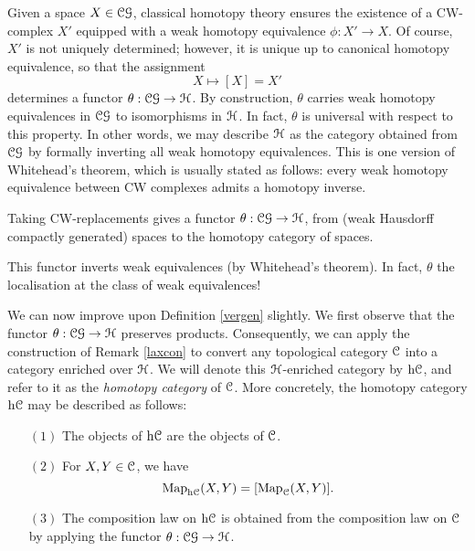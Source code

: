 Given a space $X \in \operatorname{\mathcal{C}\mathcal{G}}$, classical homotopy theory ensures the existence of a CW-complex
$X'$ equipped with a weak homotopy equivalence $\phi: X' \rightarrow X$. Of course,
$X'$ is not uniquely determined; however, it is unique up to canonical homotopy equivalence,
so that the assignment
$$ X \mapsto [X] = X'$$
determines a functor $\theta: \operatorname{\mathcal{C}\mathcal{G}} \rightarrow \operatorname{\mathcal{H}}$. By construction, $\theta$ carries
weak homotopy equivalences in $\operatorname{\mathcal{C}\mathcal{G}}$ to isomorphisms in $\operatorname{\mathcal{H}}$. In fact, $\theta$
is universal with respect to this property. In other words, we may describe $\operatorname{\mathcal{H}}$
as the category obtained from $\operatorname{\mathcal{C}\mathcal{G}}$ by formally inverting all weak homotopy equivalences.
This is one version of Whitehead's theorem, which is usually stated as follows: every weak homotopy equivalence between CW complexes admits a homotopy inverse.
\begin{shaded}
Taking CW-replacements gives a functor $\theta: \operatorname{\mathcal{C}\mathcal{G}} \rightarrow \operatorname{\mathcal{H}}$, from (weak Hausdorff compactly generated) spaces to the homotopy category of spaces.

This functor inverts weak equivalences (by Whitehead's theorem). In fact, $\theta$ the localisation at the class of weak equivalences!
\end{shaded}


We can now improve upon Definition \ref{vergen} slightly. We first observe that
the functor $\theta: \operatorname{\mathcal{C}\mathcal{G}} \rightarrow \operatorname{\mathcal{H}}$ preserves products. Consequently, we can apply the construction of Remark \ref{laxcon} to convert any topological category $\operatorname{\mathcal{C}}$ into a category enriched over $\operatorname{\mathcal{H}}$. We will denote this $\operatorname{\mathcal{H}}$-enriched category by $\rm{h} \it{\operatorname{\mathcal{C}}}$, and refer to it as the {\it homotopy category} of $\operatorname{\mathcal{C}}$. More concretely, the homotopy category
$\rm{h} \it{\operatorname{\mathcal{C}}}$ may be described as follows:
\begin{itemize}
\item[$(1)$] The objects of $\rm{h} \it{\operatorname{\mathcal{C}}}$ are the objects of $\operatorname{\mathcal{C}}$.
\item[$(2)$] For $X,Y \in \operatorname{\mathcal{C}}$, we have
$$ \operatorname{{Map}}_{ \rm{h} \it{\operatorname{\mathcal{C}}} }(X,Y) = [ \operatorname{{Map}}_{\operatorname{\mathcal{C}}}(X,Y) ].$$
\item[$(3)$] The composition law on $\rm{h} \it{\operatorname{\mathcal{C}}}$ is obtained from the composition law on
$\operatorname{\mathcal{C}}$ by applying the functor $\theta: \operatorname{\mathcal{C}\mathcal{G}} \rightarrow \operatorname{\mathcal{H}}$.
\end{itemize}

